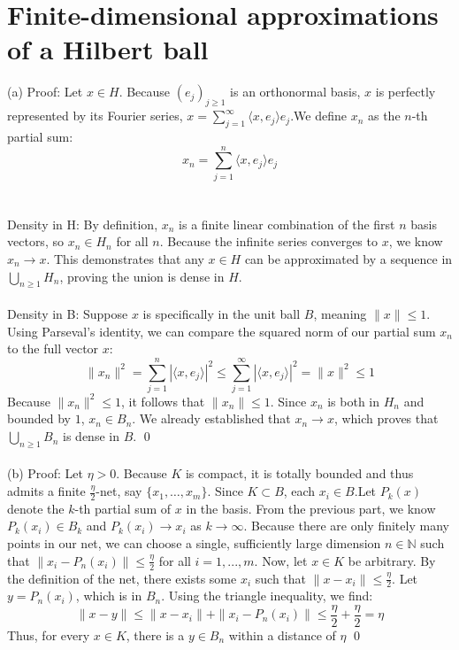 \documentclass{article}
\begin{document}
\section{Finite-dimensional approximations of a Hilbert ball}
(a)
Proof: Let $x \in H$. Because $(e_j)_{j\geq 1}$ is an orthonormal basis, $x$ is perfectly represented by its Fourier series, $x = \sum_{j=1}^{\infty} \langle x, e_j \rangle e_j$.We define $x_n$ as the $n$-th partial sum:$$x_n = \sum_{j=1}^{n} \langle x, e_j \rangle e_j$$
\\
\\
Density in H: By definition, $x_n$ is a finite linear combination of the first $n$ basis vectors, so $x_n \in H_n$ for all $n$. Because the infinite series converges to $x$, we know $x_n \to x$. This demonstrates that any $x \in H$ can be approximated by a sequence in $\bigcup_{n\geq 1} H_n$, proving the union is dense in $H$.
\\
\\
Density in B: Suppose $x$ is specifically in the unit ball $B$, meaning $\|x\| \leq 1$. Using Parseval's identity, we can compare the squared norm of our partial sum $x_n$ to the full vector $x$:$$\|x_n\|^2 = \sum_{j=1}^{n} |\langle x, e_j \rangle|^2 \leq \sum_{j=1}^{\infty} |\langle x, e_j \rangle|^2 = \|x\|^2 \leq 1$$Because $\|x_n\|^2 \leq 1$, it follows that $\|x_n\| \leq 1$. Since $x_n$ is both in $H_n$ and bounded by $1$, $x_n \in B_n$. We already established that $x_n \to x$, which proves that $\bigcup_{n\geq 1} B_n$ is dense in $B$.  \qed
\\
\\
(b) Proof: Let $\eta > 0$. Because $K$ is compact, it is totally bounded and thus admits a finite $\frac{\eta}{2}$-net, say $\{x_1, \dots, x_m\}$. Since $K \subset B$, each $x_i \in B$.Let $P_k(x)$ denote the $k$-th partial sum of $x$ in the basis. From the previous part, we know $P_k(x_i) \in B_k$ and $P_k(x_i) \to x_i$ as $k \to \infty$. Because there are only finitely many points in our net, we can choose a single, sufficiently large dimension $n \in \mathbb{N}$ such that $\|x_i - P_n(x_i)\| \leq \frac{\eta}{2}$ for all $i = 1, ..., m$. Now, let $x \in K$ be arbitrary. By the definition of the net, there exists some $x_i$ such that $\|x - x_i\| \leq \frac{\eta}{2}$. Let $y = P_n(x_i)$, which is in $B_n$. Using the triangle inequality, we find:$$\|x - y\| \leq \|x - x_i\| + \|x_i - P_n(x_i)\| \leq \frac{\eta}{2} + \frac{\eta}{2} = \eta$$Thus, for every $x \in K$, there is a $y \in B_n$ within a distance of $\eta$ \qed
\\
\end{document}
